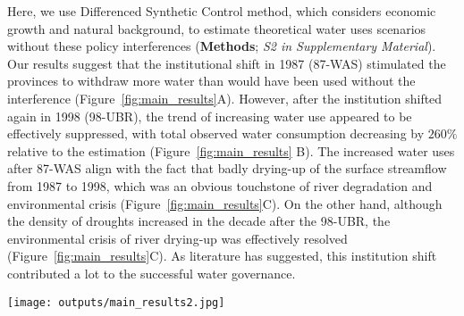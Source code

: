 Here, we use Differenced Synthetic Control method, which considers economic growth and natural background, to estimate theoretical water uses scenarios without these policy interferences (\textbf{Methods}; \textit{S2 in Supplementary Material}).
Our results suggest that the institutional shift in 1987 (87-WAS) stimulated the provinces to withdraw more water than would have been used without the interference (Figure~\ref{fig:main_results}A).
However, after the institution shifted again in 1998 (98-UBR), the trend of increasing water use appeared to be effectively suppressed, with total observed water consumption decreasing by $260\%$ relative to the estimation (Figure~\ref{fig:main_results} B).
The increased water uses after 87-WAS align with the fact that badly drying-up of the surface streamflow from 1987 to 1998, which was an obvious touchstone of river degradation and environmental crisis (Figure~\ref{fig:main_results}C).
On the other hand, although the density of droughts increased in the decade after the 98-UBR, the environmental crisis of river drying-up was effectively resolved (Figure~\ref{fig:main_results}C).
As literature has suggested, this institution shift contributed a lot to the successful water governance.

\begin{figure*}[!h]
    \centering
    \texttt{[image: outputs/main\_results2.jpg]}
    \caption{
        Effects of two institutional shifts on water resources use and allocation in the Yellow River Basin (YRB).
        \textbf{A.} water uses of the YRB before and after the institutional shift in 1987 (87-WAS);
        \textbf{B.} water uses of the YRB before and after the institutional shift in 1998 (98-UBR). While the blue lines are statistic water use data, grey ones are the estimation from the Differenced Synthetic Control method with economic and environmental background controlled.
        \textbf{C.}
    }
    \label{fig:main_results}
\end{figure*}

